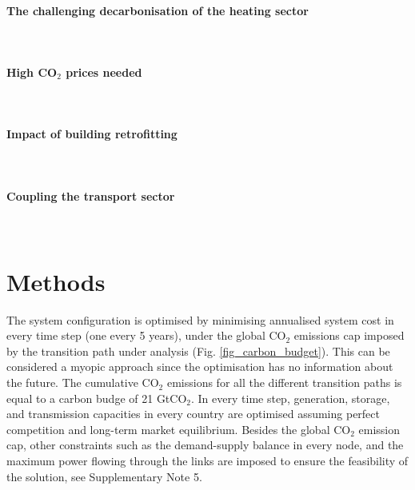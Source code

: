 \documentclass[5p]{elsarticle} %
\begin{document}
\paragraph{\textbf{The challenging decarbonisation of the heating sector}} \
\paragraph{\textbf{High CO$_2$ prices needed}} \
\paragraph{\textbf{Impact of building retrofitting}} \
\paragraph{\textbf{Coupling the transport sector}} \



\section{Methods}

The system configuration is optimised by minimising annualised system cost in every time step (one every 5 years), under the global CO$_2$ emissions cap imposed by the transition path under analysis (Fig. \ref{fig_carbon_budget}). This can be considered a myopic approach since the optimisation has no information about the future. The cumulative CO$_2$ emissions for all the different transition paths is equal to a carbon budge of 21 GtCO$_2$. In every time step, generation, storage, and transmission capacities in every country are optimised assuming perfect competition and long-term market equilibrium. Besides the global CO$_2$ emission cap, other constraints such as the demand-supply balance in every node, and the maximum power flowing through the links are imposed to ensure the feasibility of the solution, see Supplementary Note 5. \
\end{document}
